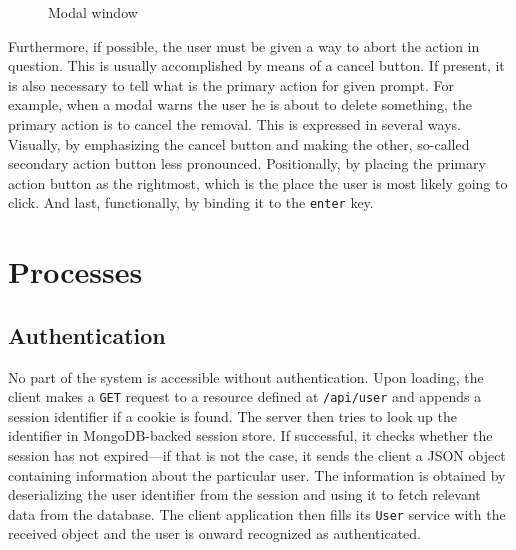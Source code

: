 \documentclass[thesis=M,english,hidelinks]{FITthesis}[2012/10/20]
\newcommand{\code}{\texttt}
\begin{document}
\begin{figure}
  \setlength\fboxsep{0pt}
  \setlength\fboxrule{0.2pt}
  \caption{Modal window}
  \label{fig:modal}
\end{figure}

Furthermore, if possible, the user must be given a way to abort the action in question. This is usually accomplished by means of a cancel button. If present, it is also necessary to tell what is the primary action for given prompt. For example, when a modal warns the user he is about to delete something, the primary action is to cancel the removal. This is expressed in several ways. Visually, by emphasizing the cancel button and making the other, so-called secondary action button less pronounced. Positionally, by placing the primary action button as the rightmost, which is the place the user is most likely going to click. And last, functionally, by binding it to the \code{enter} key.

\chapter{Processes}
\label{chap:processes}

  \section{Authentication}

No part of the system is accessible without authentication. Upon loading, the client makes a \code{GET} request to a resource defined at \code{/api/user} and appends a session identifier if a cookie is found. The server then tries to look up the identifier in MongoDB-backed session store. If successful, it checks whether the session has not expired---if that is not the case, it sends the client a JSON object containing information about the particular user. The information is obtained by deserializing the user identifier from the session and using it to fetch relevant data from the database. The client application then fills its \code{User} service with the received object and the user is onward recognized as authenticated.
\end{document}
